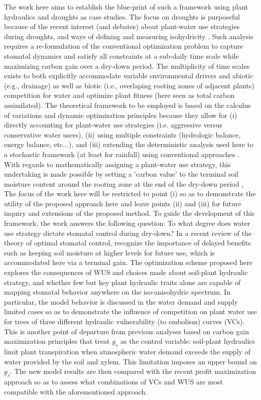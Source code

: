 \documentclass[utf8]{frontiersSCNS} %
\begin{document}
The work here aims to establish the blue-print of such a framework using plant hydraulics and droughts as case studies.  The focus on droughts is purposeful because of the recent interest (and debates) about plant-water use strategies during droughts, and ways of defining and measuring isohydricity \citep{franks_anisohydric_2007,martinezvilalta_new_2014,meinzer_mapping_2016}.  Such analysis requires a re-formulation of the conventional optimization problem to capture stomatal dynamics and satisfy all constraints at a sub-daily time scale while maximizing carbon gain over a dry-down period. The multiplicity of time scales exists to both explicitly accommodate variable environmental drivers and abiotic (e.g., drainage) as well as biotic (i.e., overlaping rooting zones of adjacent plants) competition for water and optimize plant fitness (here seen as total carbon assimilated). The theoretical framework to be employed is based on the calculus of variations and dynamic optimization principles because they allow for (i) directly accounting for plant-water use strategies (i.e. aggressive versus conservative water users), (ii) using multiple constraints (hydrologic balance, energy balance, etc...), and  (iii) extending the deterministic analysis used here to a stochastic framework (at least for rainfall) using conventional approaches  \citep{cowan1986economics,makela1996optimal,manzoni_optimization_2013,lu2016optimal}.  With regards to mathematically assigning a plant-water use strategy, this undertaking is made possible by setting a 'carbon value' to the terminal soil moisture content around the rooting zone at the end of the dry-down period \citep{manzoni_optimization_2013},   The focus of the work here will be restricted to point (i) so as to demonstrate the utility of the proposed approach here and leave points (ii) and (iii) for future inquiry and extensions of the proposed method.   
To guide the development of this framework, the work answers the following question: To what degree does water use strategy dictate stomatal control during dry-down? In a recent review of the theory of optimal stomatal control, \citet{buckley_optimal_2017} recognize the importance of delayed benefits such as keeping soil moisture at higher levels for future use, which is accommodated here via a terminal gain. The optimization scheme proposed here explores the consequences of WUS and choices made about soil-plant hydraulic strategy, and whether few but key plant hydraulic traits alone are capable of mapping stomatal behavior anywhere on the iso-anisohydric spectrum. In particular, the model behavior is discussed in the water demand and supply limited cases so as to demonstrate the influence of competition on plant water use for trees of three different hydraulic vulnerability (to embolism)  curves (VCs). This is another point of departure from previous analyses based on carbon gain maximization principles that treat $g_s$ as the control variable: soil-plant hydraulics limit plant transpiration when atmospheric water demand exceeds the supply of water provided by the soil and xylem. This limitation imposes an upper bound on $g_s$. The new model results are then compared with the recent profit maximization approach so as to assess what combinations of VCs and WUS are most compatible with the aforementioned approach.
\end{document}
